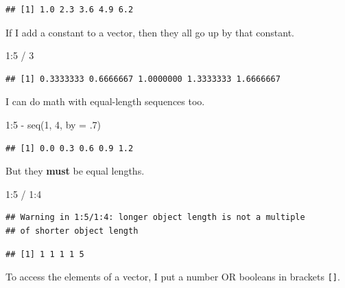 \documentclass[
]{book}
\newenvironment{Shaded}{\begin{snugshade}}{\end{snugshade}}
\newcommand{\AttributeTok}[1]{\textcolor[rgb]{0.77,0.63,0.00}{#1}}
\newcommand{\DecValTok}[1]{\textcolor[rgb]{0.00,0.00,0.81}{#1}}
\newcommand{\FunctionTok}[1]{\textcolor[rgb]{0.00,0.00,0.00}{#1}}
\newcommand{\NormalTok}[1]{#1}
\newcommand{\SpecialCharTok}[1]{\textcolor[rgb]{0.00,0.00,0.00}{#1}}
\begin{document}
\begin{verbatim}
## [1] 1.0 2.3 3.6 4.9 6.2
\end{verbatim}

If I add a constant to a vector, then they all go up by that constant.

\begin{Shaded}
\begin{Highlighting}[]
\DecValTok{1}\SpecialCharTok{:}\DecValTok{5} \SpecialCharTok{/} \DecValTok{3}
\end{Highlighting}
\end{Shaded}

\begin{verbatim}
## [1] 0.3333333 0.6666667 1.0000000 1.3333333 1.6666667
\end{verbatim}

I can do math with equal-length sequences too.

\begin{Shaded}
\begin{Highlighting}[]
\DecValTok{1}\SpecialCharTok{:}\DecValTok{5} \SpecialCharTok{{-}} \FunctionTok{seq}\NormalTok{(}\DecValTok{1}\NormalTok{, }\DecValTok{4}\NormalTok{, }\AttributeTok{by =}\NormalTok{ .}\DecValTok{7}\NormalTok{)}
\end{Highlighting}
\end{Shaded}

\begin{verbatim}
## [1] 0.0 0.3 0.6 0.9 1.2
\end{verbatim}

But they \textbf{must} be equal lengths.

\begin{Shaded}
\begin{Highlighting}[]
\DecValTok{1}\SpecialCharTok{:}\DecValTok{5} \SpecialCharTok{/} \DecValTok{1}\SpecialCharTok{:}\DecValTok{4}
\end{Highlighting}
\end{Shaded}

\begin{verbatim}
## Warning in 1:5/1:4: longer object length is not a multiple
## of shorter object length
\end{verbatim}

\begin{verbatim}
## [1] 1 1 1 1 5
\end{verbatim}

To access the elements of a vector, I put a number OR booleans in brackets \texttt{{[}{]}}.
\end{document}
